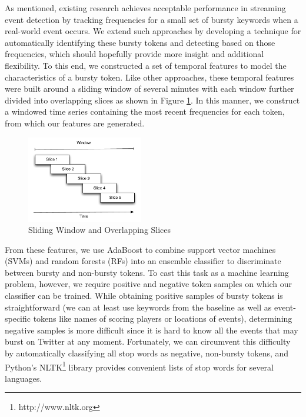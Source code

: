\documentclass{acm_proc_article-sp}
\begin{document}
As mentioned, existing research achieves acceptable performance in streaming event detection by tracking frequencies for a small set of bursty keywords when a real-world event occurs.
We extend such approaches by developing a technique for automatically identifying these bursty tokens and detecting based on those frequencies, which should hopefully provide more insight and additional flexibility.
To this end, we constructed a set of temporal features to model the characteristics of a bursty token.
Like other approaches, these temporal features were built around a sliding window of several minutes with each window further divided into overlapping slices as shown in Figure \ref{fig:windowSlices}.
In this manner, we construct a windowed time series containing the most recent frequencies for each token, from which our features are generated.

\begin{figure}[hbtp]
\begin{center}
\includegraphics[width=2in]{./figures/slidingWindowSlices.pdf}
\caption{Sliding Window and Overlapping Slices}
\label{fig:windowSlices}
\end{center}
\end{figure}

From these features, we use AdaBoost to combine support vector machines (SVMs) and random forests (RFs) into an ensemble classifier to discriminate between bursty and non-bursty tokens.
To cast this task as a machine learning problem, however, we require positive and negative token samples on which our classifier can be trained.
While obtaining positive samples of bursty tokens is straightforward (we can at least use keywords from the baseline as well as event-specific tokens like names of scoring players or locations of events), determining negative samples is more difficult since it is hard to know all the events that may burst on Twitter at any moment.
Fortunately, we can circumvent this difficulty by automatically classifying all stop words as negative, non-bursty tokens, and Python's NLTK\footnote{http://www.nltk.org} library provides convenient lists of stop words for several languages.
\end{document}
